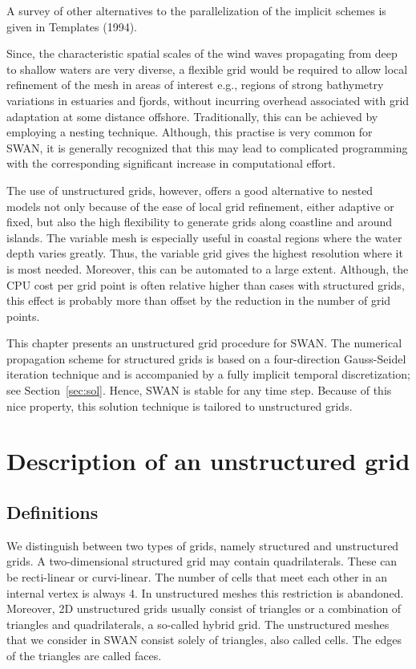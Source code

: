 \documentclass[12pt]{book}
\begin{document}
A survey of other alternatives to the parallelization of the implicit schemes is given in Templates (1994).

 \label{ch:unswan}

Since, the characteristic spatial scales of the wind waves propagating from deep to shallow waters are very
diverse, a flexible grid would be required to allow local refinement of the mesh
in areas of interest  e.g.,
regions of strong bathymetry variations in estuaries and fjords,
without incurring
overhead associated with grid adaptation at some distance offshore. Traditionally, this can be achieved by employing
a nesting technique.
Although, this practise is very common for SWAN, it is generally recognized that
this may lead to complicated programming with the corresponding significant increase in computational effort.

The use of unstructured grids, however, offers a good alternative to nested models not only because of the
ease of local grid refinement, either adaptive or fixed, but also the high flexibility to generate
grids along coastline and around islands.
The variable mesh is especially useful in coastal regions where the water depth varies greatly.
Thus, the variable grid gives the highest resolution where it is most needed.
Moreover, this can be automated to a large extent.
Although, the CPU cost per grid point is often relative higher than cases with structured grids,
this effect is probably more than offset by the reduction in the number of grid points.

This chapter presents an unstructured grid procedure for SWAN.
The numerical propagation scheme for structured grids is based on
a four-direction Gauss-Seidel iteration technique and is accompanied by a fully implicit temporal discretization; see Section~\ref{sec:sol}.
Hence, SWAN is stable for any time step.
Because of this nice property, this solution technique is tailored to unstructured grids.

\section{Description of an unstructured grid}
\label{sec:defunstr}

\subsection{Definitions}

We distinguish between two types of grids, namely structured and unstructured grids. A two-dimensional structured grid may contain quadrilaterals. These
can be recti-linear or curvi-linear. The number
of cells that meet each other in an internal vertex is always 4. In unstructured meshes this restriction is abandoned. Moreover, 2D unstructured grids usually
consist of triangles or a combination of triangles and quadrilaterals, a so-called hybrid grid. The unstructured meshes that we consider in SWAN consist solely
of triangles, also called cells. The edges of the triangles are called faces.
\end{document}
